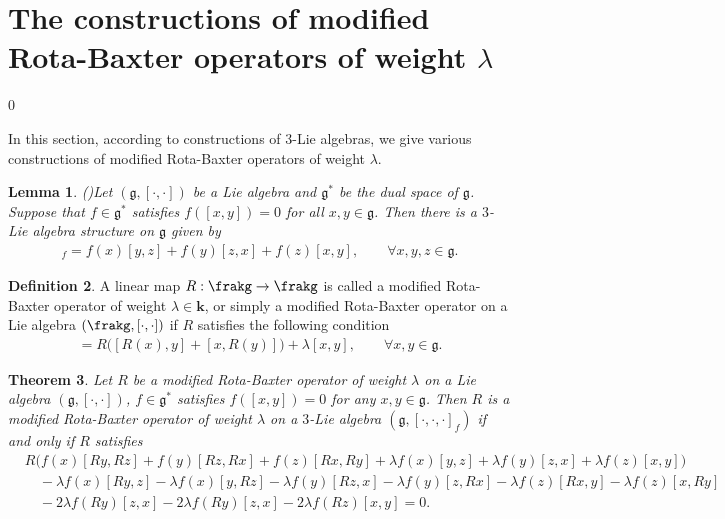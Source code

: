 \documentclass[12pt]{amsart}
\newtheorem{theorem}{Theorem}[section]
\newtheorem{lem}[theorem]{Lemma}
\theoremstyle{definition}
\newtheorem{defn}[theorem]{Definition}
\begin{document}
\section{The constructions of modified Rota-Baxter operators of weight  $\lambda$}\label{The constructions of modified Rota-Baxter operators}
\def\theequation{\arabic{section}.\arabic{equation}}
\setcounter{equation} {0}

In this section, according to constructions of $3$-Lie algebras,  we give various constructions of  modified Rota-Baxter operators of weight  $\lambda$.
\begin{lem}(\cite{B10})\label{4.1}
Let $(\mathfrak{g}, [\cdot, \cdot])$ be a Lie algebra and $\mathfrak{g}^{\ast}$ be the dual space of $\mathfrak{g}$.
Suppose that $f\in \mathfrak{g}^{\ast}$ satisfies $f([x, y]) = 0$ for all $x, y \in  \mathfrak{g}$.
Then there is a  $3$-Lie algebra structure on $\mathfrak{g}$ given by
\begin{align*}
[x, y, z]_f = f(x)[y, z] + f(y)[z, x] + f(z)[x, y], \quad \quad \forall x, y, z \in \mathfrak{g}.
\end{align*}
\end{lem}
\begin{defn}
 A linear map $R: \frakg\rightarrow \frakg$ is called a modified Rota-Baxter operator of weight $\lambda\in \mathbf{k}$, or simply a modified Rota-Baxter operator on a Lie algebra $(\frakg, [\cdot, \cdot])$ if $R$ satisfies the following condition
 \begin{align*}
[R(x), R(y)]=R\Big([R(x), y]+[x,R(y)]\Big)+\lambda [x, y], \quad \quad \forall x, y\in \mathfrak{g}.
\end{align*}
\end{defn}
\begin{theorem}\label{4.2}
Let $R$ be a   modified Rota-Baxter operator of weight $\lambda$ on a Lie algebra $(\mathfrak{g}, [\cdot, \cdot])$, $f\in \mathfrak{g}^{\ast}$ satisfies $f([x, y]) = 0$ for any $x, y \in  \mathfrak{g}$.  Then $R$ is  a   modified Rota-Baxter operator of weight  $\lambda$ on a $3$-Lie algebra $(\mathfrak{g}, [\cdot,\cdot,\cdot]_f)$ if and only if  $R$ satisfies
\begin{align*}
&R\Big(f(x)[Ry, Rz]+f(y)[Rz, Rx]+f(z)[Rx, Ry]+\lambda f(x)[y, z] +\lambda f(y)[z, x] + \lambda f(z)[x, y]\Big)\\
&\quad-\lambda f(x)[Ry, z]-\lambda f(x)[y, Rz] - \lambda f(y)[Rz, x]-\lambda  f(y)[z, Rx]-\lambda f(z)[Rx, y]-\lambda f(z)[x, Ry]\\
&\quad-2\lambda f(Ry)[z, x]-2\lambda f(Ry)[z, x]-2\lambda f(Rz)[x, y]=0.
\end{align*}
\end{theorem}
\end{document}
